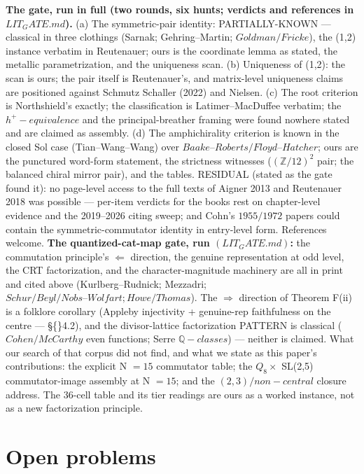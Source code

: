 \documentclass[11pt]{article}
\theoremstyle{plain}
\theoremstyle{definition}
\theoremstyle{remark}
\begin{document}
\textbf{The gate, run in full (two rounds, six hunts; verdicts and references in \(LIT_{G}ATE.md\)).} (a) The symmetric-pair identity: PARTIALLY-KNOWN — classical in three clothings (Sarnak; Gehring–Martin; \(Goldman/Fricke\)), the (1,2) instance verbatim in Reutenauer; ours is the coordinate lemma as stated, the metallic parametrization, and the uniqueness scan. (b) Uniqueness of (1,2): the scan is ours; the pair itself is Reutenauer's, and matrix-level uniqueness claims are positioned against Schmutz Schaller (2022) and Nielsen. (c) The root criterion is Northshield's exactly; the classification is Latimer–MacDuffee verbatim; the \(h^{+}-equivalence\) and the principal-breather framing were found nowhere stated and are claimed as assembly. (d) The amphichirality criterion is known in the closed Sol case (Tian–Wang–Wang) over \(Baake–Roberts/Floyd–Hatcher\); ours are the punctured word-form statement, the strictness witnesses (\((\mathbb{Z}/12)^{2}\) pair; the balanced chiral mirror pair), and the tables. RESIDUAL (stated as the gate found it): no page-level access to the full texts of Aigner 2013 and Reutenauer 2018 was possible — per-item verdicts for the books rest on chapter-level evidence and the 2019–2026 citing sweep; and Cohn's \(1955/1972\) papers could contain the symmetric-commutator identity in entry-level form. References welcome. \textbf{The quantized-cat-map gate, run \((LIT_{G}ATE.md)\):} the commutation principle's \(\Longleftarrow \) direction, the genuine representation at odd level, the CRT factorization, and the character-magnitude machinery are all in print and cited above (Kurlberg–Rudnick; Mezzadri; \(Schur/Beyl/Nobs–Wolfart; Howe/Thomas\)). The \(\Longrightarrow \) direction of Theorem F(ii) is a folklore corollary (Appleby injectivity + genuine-rep faithfulness on the centre — \S\{\}4.2), and the divisor-lattice factorization PATTERN is classical (\(Cohen/McCarthy\) even functions; Serre \(\mathbb{Q}-classes\)) — neither is claimed. What our search of that corpus did not find, and what we state as this paper's contributions: the explicit N \(= 15\) commutator table; the \(Q_{8} \times \) SL(2,5) commutator-image assembly at N \(= 15\); and the \((2,3)/non-central\) closure address. The 36-cell table and its tier readings are ours as a worked instance, not as a new factorization principle.

\section{Open problems}
\end{document}

